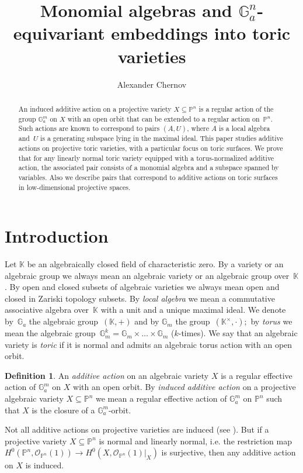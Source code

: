 \documentclass[a4paper,draft,reqno,12pt]{amsart}
\title{Monomial algebras and $\mathbb{G}_a^n$-equivariant embeddings into toric varieties}
\author{Alexander Chernov}
\theoremstyle{definition}
\newtheorem{definition}{Definition}
\theoremstyle{definition}
\theoremstyle{remark}
\def\BG{{\mathbb G}}
\def\BK{{\mathbb K}}
\def\BG{{\mathbb G}}
\def\BK{{\mathbb K}}
\def\BP{{\mathbb P}}
\def\CO{\mathcal{O}}
\begin{document}
\maketitle


\begin{abstract}
An induced additive action on a projective variety $X\subseteq\mathbb{P}^n$ is a regular action of the group $\mathbb{G}_a^m$ on $X$ with an open orbit that can be extended to a regular action on~$\mathbb{P}^n$. Such actions are known to correspond to pairs $(A, U)$, where $A$ is a local algebra and~$U$ is a generating subspace lying in the maximal ideal. This paper studies additive actions on projective toric varieties, with a particular focus on toric surfaces. We prove that for any linearly normal toric variety equipped with a torus-normalized additive action, the associated pair consists of a monomial algebra and a subspace spanned by variables. Also we describe pairs that correspond to additive actions on toric surfaces in low-dimensional projective spaces.
\end{abstract}

\section{Introduction}
Let $\BK$ be an algebraically closed field of characteristic zero. By a variety or an algebraic group we always mean an algebraic variety or an algebraic group over~$\BK$. By open and closed subsets of algebraic varieties we always mean open and closed in Zariski topology subsets. By \emph{local algebra} we mean a commutative associative algebra over~$\BK$ with a unit and a unique maximal ideal. We denote by~$\BG_a$ the algebraic group~$(\BK, +)$ and by $\BG_m$ the group~$(\BK^\times,\cdot);$ by \emph{torus} we mean the algebraic group~$\BG_m^k=\BG_m\times\dotsc\times\BG_m$ ($k$-times). We say that an algebraic variety is \emph{toric} if it is normal and admits an algebraic torus action with an open orbit.

\begin{definition}
    An \emph{additive action} on an algebraic variety $X $ is a regular effective action of $\BG_a^m$ on $X$ with an open orbit. By \emph{induced additive action} on a projective algebraic variety $X \subseteq \BP^n$ we mean a regular effective action of $\BG_a^m$ on $\BP^n$ such that $X$ is the closure of a $\BG_a^m$-orbit.   
\end{definition}

Not all additive actions on projective varieties are induced (see \cite[Example 1]{AP}). But if a projective variety $X\subseteq \BP^n$ is normal and linearly normal, i.e. the restriction map~$H^0(\BP^n,\CO_{\BP^n}(1))\to H^0(X, \CO_{\BP^n}(1)\big|_X)$ is surjective, then any additive action on $X$ is induced.
\end{document}
